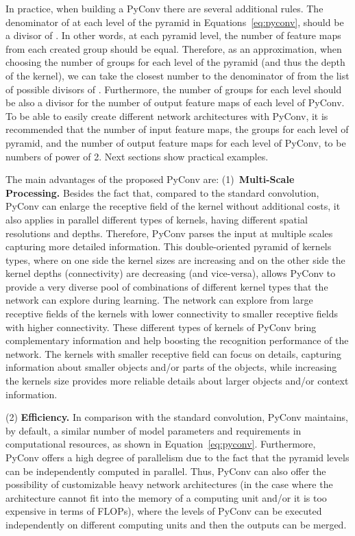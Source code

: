 \documentclass{article}
\begin{document}
In practice, when building a PyConv there are several additional rules. The denominator of  at each level of the pyramid in Equations~\ref{eq:pyconv}, should be a divisor of . In other words, at each pyramid level, the number of feature maps from each created group should be equal. Therefore, as an approximation, when choosing the number of groups for each level of the pyramid (and thus the depth of the kernel), we can take the closest number to the denominator of  from the list of possible divisors of . Furthermore, the number of groups for each level should be also a divisor for the number of output feature maps of each level of PyConv. To be able to easily create  different network architectures with PyConv, it is recommended that the number of input feature maps, the groups for each level of pyramid, and the number of output feature maps for each level of PyConv, to be numbers of power of 2. Next sections show practical examples.




The main advantages of the proposed PyConv are:
(1)~{\bf Multi-Scale Processing.} Besides the fact that, compared to the standard convolution,  PyConv can enlarge the receptive field of the kernel without additional costs,  it also applies in parallel different types of kernels, having different spatial resolutions and depths. Therefore, PyConv parses the input at multiple scales capturing more detailed information. This  double-oriented  pyramid of kernels types, where on one side the kernel sizes are increasing and on the other side the kernel depths (connectivity) are decreasing (and vice-versa), allows PyConv to  provide a very diverse pool of combinations of different kernel types that the network can explore during learning. The network can explore from large receptive fields of the kernels with lower connectivity to smaller receptive fields with higher connectivity.
These different types of kernels of PyConv bring complementary information and help boosting the recognition performance of the network. The kernels with smaller receptive field can focus on details, capturing information about smaller objects and/or parts of the objects, while increasing the kernels size provides more reliable details about larger objects and/or context information.

(2) {\bf Efficiency.} In comparison with the standard convolution, PyConv maintains, by default, a similar number of model parameters and requirements in computational resources, as shown in Equation~\ref{eq:pyconv}. Furthermore, PyConv offers a high degree of parallelism due to the fact that the pyramid levels can be  independently  computed in parallel. Thus, PyConv can also offer the possibility of customizable heavy network architectures (in the case where the architecture cannot fit into the memory of a computing unit and/or it is too expensive in terms of FLOPs), where the levels of PyConv can be executed independently on different computing units and then the outputs can be merged.
\end{document}
